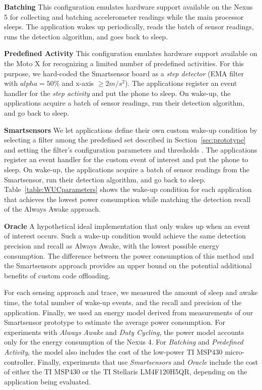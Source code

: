 \textbf{Batching} This configuration emulates hardware support
available on the Nexus 5 for collecting and batching accelerometer
readings while the main processor sleeps.  The application wakes up
periodically, reads the batch of sensor readings, runs the detection
algorithm, and goes back to sleep.

\textbf{Predefined Activity} This configuration emulates hardware
support available on the Moto X for recognizing a limited number of
predefined activities.  For this purpose, we hard-coded the
Smartsensor board as a {\em step detector} (EMA filter with $alpha =
50\%$ and x-axis $\ge 2 m/s^2$).  The applications register an event
handler for the {\em step activity} and put the phone to sleep.  On
wake-up, the applications acquire a batch of sensor readings, run
their detection algorithm, and go back to sleep.

\textbf{Smartsensors} We let applications define their own custom wake-up 
condition by selecting a filter among the predefined set described
in Section~\ref{sec:prototype} and setting the filter's configuration
parameters and thresholds .  The applications register an event handler
for the custom event of interest and put the phone to sleep.  On
wake-up, the applications acquire a batch of sensor readings from the
Smartsensor, run their detection algorithm, and go back to sleep.
Table~\ref{table:WUCparameters} shows the wake-up condition for each
application that achieves the lowest power consumption while matching
the detection recall of the Always Awake approach.

\textbf{Oracle} A hypothetical ideal implementation that only wakes up
when an event of interest occurs.  Such a wake-up condition would
achieve the same detection precision and recall as Always Awake, with
the lowest possible energy consumption. The difference between the
power consumption of this method and the Smartsensors approach
provides an upper bound on the potential additional benefits of custom
code offloading.

For each sensing approach and trace, we measured the amount of sleep
and awake time, the total number of wake-up events, and the recall and
precision of the application.  Finally, we used an energy model
derived from measurements of our Smartsensor prototype to estimate
the average power consumption.  For experiments with {\em Always Awake}
and {\em Duty Cycling}, the power model accounts only for the energy
consumption of the Nexus 4.  For {\em Batching} and {\em Predefined Activity},
the model also includes the cost of the low-power TI MSP430
micro-controller.  Finally, experiments that use {\em Smartsensors} and {\em
  Oracle} include the cost of either the TI MSP430 or the TI Stellaris
LM4F120H5QR, depending on the application being evaluated.








